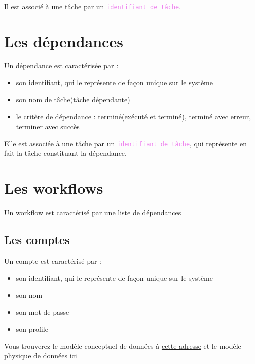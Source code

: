 \documentclass{bouygues-fr}
\begin{document}
Il est associé à une tâche par un \textcolor{violet}{\texttt{identifiant de tâche}}.

\section{Les dépendances}
Un dépendance est caractérisée par :
\begin{itemize}
\item son identifiant, qui le représente de façon unique sur le système
\item son nom de tâche(tâche dépendante)
\item le critère de dépendance : terminé(exécuté et terminé), terminé avec erreur, terminer avec succès
\end{itemize} 

Elle est associée à une tâche par un \textcolor{violet}{\texttt{identifiant de tâche}}, qui représente en fait la tâche constituant la dépendance.

\section{Les workflows}
Un workflow est caractérisé par une liste de dépendances

\subsection{Les comptes}
Un compte est caractérisé par :
\begin{itemize}
\item son identifiant, qui le représente de façon unique sur le système
\item son nom
\item son mot de passe
\item son profile
\end{itemize} 

Vous trouverez le modèle conceptuel de données à \href{https://mcp-d.admin.dolmen.bouyguestelecom.fr/fancycron/DOCS/MCD_FC.pdf}{cette adresse} et le modèle physique de données \href{https://mcp-d.admin.dolmen.bouyguestelecom.fr/fancycron/DOCS/MPD_FC.pdf}{ici}

\end{document}
